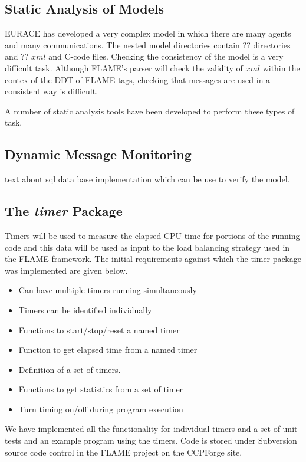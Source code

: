 \subsection{Static Analysis of Models}
EURACE has developed a very complex model in which there are many agents and many communications. The nested model directories contain ?? directories and ?? $xml$ and C-code files. Checking the consistency of the model is a very difficult task. Although FLAME's parser will check the validity of $xml$ within the contex of the DDT of FLAME tags, checking that messages are used in a consistent way is difficult.

A number of static analysis tools have been developed to perform these types of task.
\subsection{Dynamic Message Monitoring}
text about sql data base implementation which can be use to verify the model.
\subsection{The \textit{timer} Package}

Timers will be used to measure the elapsed CPU time for portions of the running code and this data will be used as input to the load balancing strategy used in the FLAME framework. The initial requirements against which the timer package was implemented are given below.

\begin{itemize}
\item Can have multiple timers running simultaneously
\item Timers can be identified individually
\item Functions to start/stop/reset a named timer
\item Function to get elapsed time from a named timer
\item Definition of a set of timers.
\item Functions to get statistics from a set of timer
\item Turn timing on/off during program execution 
\end{itemize}

We have implemented all the functionality for individual timers and a set of unit tests and an example program using the timers. Code is stored under Subversion source code control in the FLAME project on the CCPForge site. 

